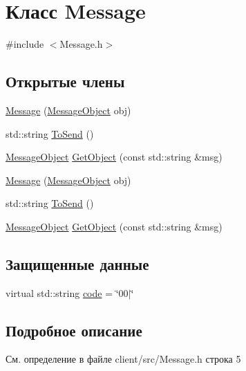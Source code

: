 \hypertarget{class_message}{}\section{Класс Message}
\label{class_message}


{\ttfamily \#include $<$Message.\+h$>$}

\subsection*{Открытые члены}
\begin{DoxyCompactItemize}
\item 
\mbox{\hyperlink{class_message_ab24cdb2c9890d77e46a333f157e4f66d}{Message}} (\mbox{\hyperlink{class_message_object}{Message\+Object}} obj)
\item 
std\+::string \mbox{\hyperlink{class_message_a04d7d7a2d696dc3183a76fcde39ebd73}{To\+Send}} ()
\item 
\mbox{\hyperlink{class_message_object}{Message\+Object}} \mbox{\hyperlink{class_message_a5e0807f65e54b9db9a9144d96c23c859}{Get\+Object}} (const std\+::string \&msg)
\item 
\mbox{\hyperlink{class_message_ab24cdb2c9890d77e46a333f157e4f66d}{Message}} (\mbox{\hyperlink{class_message_object}{Message\+Object}} obj)
\item 
std\+::string \mbox{\hyperlink{class_message_a04d7d7a2d696dc3183a76fcde39ebd73}{To\+Send}} ()
\item 
\mbox{\hyperlink{class_message_object}{Message\+Object}} \mbox{\hyperlink{class_message_a5e0807f65e54b9db9a9144d96c23c859}{Get\+Object}} (const std\+::string \&msg)
\end{DoxyCompactItemize}
\subsection*{Защищенные данные}
\begin{DoxyCompactItemize}
\item 
virtual std\+::string \mbox{\hyperlink{class_message_a23a66db51f9ec75f727b0838c5d65a55}{code}} = \char`\"{}00$\vert$\char`\"{}
\end{DoxyCompactItemize}


\subsection{Подробное описание}


См. определение в файле client/src/\+Message.\+h строка 5



